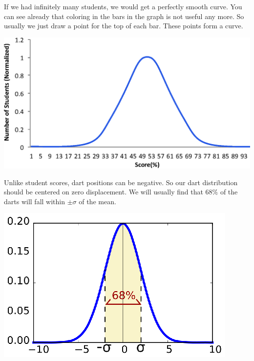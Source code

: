 \documentclass{book}%
\begin{document}
If we had infinitely many students, we would get a perfectly smooth curve.
You can see already that coloring in the bars in the graph is not useful any
more. So usually we just draw a point for the top of each bar. These points
form a curve.

\begin{center}
\includegraphics[scale=0.5]{Lab2_figs/hist_smooth.eps}
\end{center}

Unlike student scores, dart positions can be negative. So our dart
distribution should be centered on zero displacement. We will usually find
that $68\%$ of the darts will fall within $\pm \sigma $ of the mean. 

\begin{center}
\includegraphics[scale=1.3]{Lab2_figs/normal_68.eps}
\end{center}
\end{document}
